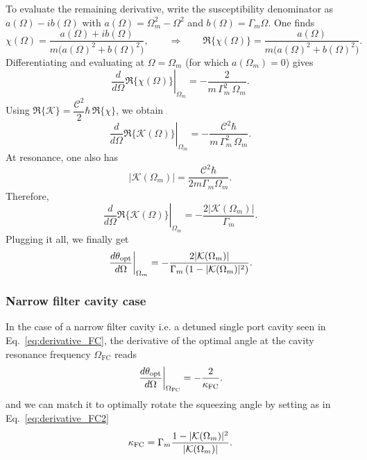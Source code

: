 To evaluate the remaining derivative, write the susceptibility denominator as
\(a(\Omega)-ib(\Omega)\) with \(a(\Omega)=\Omega_m^2-\Omega^2\) and
\(b(\Omega)=\Gamma_m\Omega\). One finds
\[
\chi(\Omega)=\frac{a(\Omega)+ib(\Omega)}{m\big(a(\Omega)^2+b(\Omega)^2\big)},
\qquad\Rightarrow\qquad
\Re\{\chi(\Omega)\}=\frac{a(\Omega)}{m\big(a(\Omega)^2+b(\Omega)^2\big)}.
\]
Differentiating and evaluating at \(\Omega=\Omega_m\) (for which \(a(\Omega_m)=0\)) gives
\[
\left.\frac{d}{d\Omega}\Re\{\chi(\Omega)\}\right|_{\Omega_m}
=
-\frac{2}{m\,\Gamma_m^2\,\Omega_m}.
\]
Using \(\Re\{\mathcal K\}=\dfrac{\mathcal C^2}{2}\hbar\,\Re\{\chi\}\), we obtain
\[
\left.\frac{d}{d\Omega}\Re\{\mathcal K(\Omega)\}\right|_{\Omega_m}
=
-\frac{\mathcal C^2\hbar}{m\,\Gamma_m^2\,\Omega_m}.
\]
At resonance, one also has
\[
|\mathcal K(\Omega_m)|
=
\frac{\mathcal C^2\hbar}{2m\Gamma_m\Omega_m}.
\]
Therefore,
\[
\left.\frac{d}{d\Omega}\Re\{\mathcal K(\Omega)\}\right|_{\Omega_m}
=
-\frac{2|\mathcal K(\Omega_m)|}{\Gamma_m}.
\]
Plugging it all, we finally get
\[
\left.\frac{d\theta_{\rm opt}}{d\Omega}\right|_{\Omega_m}
=
-\frac{2|\mathcal K(\Omega_m)|}
{\Gamma_m\left(1-|\mathcal K(\Omega_m)|^2\right)}.
\]
\subsubsection{Narrow filter cavity case}
In the case of a narrow filter cavity i.e. a detuned single port cavity seen in Eq.~\eqref{eq:derivative_FC}, the derivative of the optimal angle at the cavity resonance frequency \(\Omega_\mathrm{FC}\) reads
\[
 \left.\frac{d\theta_{\rm opt}}{d\Omega}\right|_{\Omega_\mathrm{FC}} = - \dfrac{2}{\kappa_{\rm FC}}. 
 \]
and we can match it to optimally rotate the squeezing angle by setting as in Eq.~\eqref{eq:derivative_FC2}
\[
  \kappa_{\rm FC} = \Gamma_m   \dfrac{1 - |\mathcal K(\Omega_m)|^2}{|\mathcal K(\Omega_m)|}. 
\] 




 
